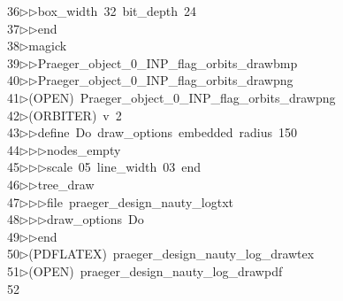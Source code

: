 \begin{tabbing}
36\>$\triangleright$\>$\triangleright$\>box\_width\ 32\ bit\_depth\ 24\ \\[0pt]
37\>$\triangleright$\>$\triangleright$\>end\\[0pt]
38\>$\triangleright$\>magick\ \\[0pt]
39\>$\triangleright$\>$\triangleright$\>Praeger\_object\_0\_INP\_flag\_orbits\_drawbmp\ \\[0pt]
40\>$\triangleright$\>$\triangleright$\>Praeger\_object\_0\_INP\_flag\_orbits\_drawpng\\[0pt]
41\>$\triangleright$\>(OPEN)\ Praeger\_object\_0\_INP\_flag\_orbits\_drawpng\\[0pt]
42\>$\triangleright$\>(ORBITER)\ v\ 2\ \\[0pt]
43\>$\triangleright$\>$\triangleright$\>define\ Do\ draw\_options\ embedded\ radius\ 150\ \\[0pt]
44\>$\triangleright$\>$\triangleright$\>$\triangleright$\>nodes\_empty\ \\[0pt]
45\>$\triangleright$\>$\triangleright$\>$\triangleright$\>scale\ 05\ line\_width\ 03\ end\ \\[0pt]
46\>$\triangleright$\>$\triangleright$\>tree\_draw\ \\[0pt]
47\>$\triangleright$\>$\triangleright$\>$\triangleright$\>file\ praeger\_design\_nauty\_logtxt\ \\[0pt]
48\>$\triangleright$\>$\triangleright$\>$\triangleright$\>draw\_options\ Do\ \\[0pt]
49\>$\triangleright$\>$\triangleright$\>end\\[0pt]
50\>$\triangleright$\>(PDFLATEX)\ praeger\_design\_nauty\_log\_drawtex\\[0pt]
51\>$\triangleright$\>(OPEN)\ praeger\_design\_nauty\_log\_drawpdf\\[0pt]
52\>\end{tabbing}
